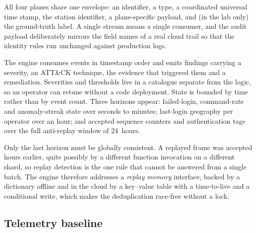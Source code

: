 \documentclass[10pt,journal]{IEEEtran}
\begin{document}
All four planes share one envelope: an identifier, a type, a coordinated
universal time stamp, the station identifier, a plane-specific payload, and (in
the lab only) the ground-truth label. A single stream means a single consumer,
and the audit payload deliberately mirrors the field names of a real cloud
trail so that the identity rules run unchanged against production logs.

The engine consumes events in timestamp order and emits findings carrying a
severity, an ATT\&CK technique, the evidence that triggered them and a
remediation. Severities and thresholds live in a catalogue separate from the
logic, so an operator can retune without a code deployment. State is bounded by
time rather than by event count. Three horizons appear: failed-login,
command-rate and anomaly-streak state over seconds to minutes; last-login
geography per operator over an hour; and accepted sequence counters and
authentication tags over the full anti-replay window of 24~hours.

Only the last horizon must be globally consistent. A replayed frame was
accepted hours earlier, quite possibly by a different function invocation on a
different shard, so replay detection is the one rule that cannot be answered
from a single batch. The engine therefore addresses a \emph{replay memory}
interface, backed by a dictionary offline and in the cloud by a key--value
table with a time-to-live and a conditional write, which makes the
deduplication race-free without a lock.

\subsection{Telemetry baseline}
\label{sec:model}
\end{document}
